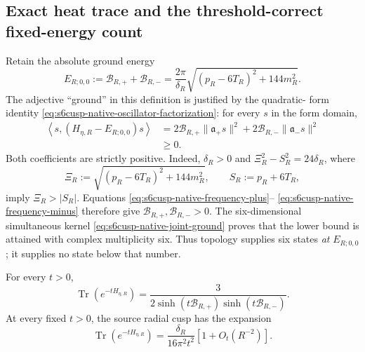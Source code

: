 \subsection{Exact heat trace and the threshold-correct fixed-energy count}
\label{subsec:s6cusp-native-heat-count}

Retain the absolute ground energy
\begin{equation}\label{eq:s6cusp-native-ground-energy}
 E_{R;0,0}:=\mathcal B_{R,+}+\mathcal B_{R,-}
 =\frac{2\pi}{\delta_R}
 \sqrt{(p_R-6T_R)^2+144m_R^2}.
\end{equation}
The adjective ``ground'' in this definition is justified by the quadratic-
form identity \eqref{eq:s6cusp-native-oscillator-factorization}: for every
\(s\) in the form domain,
\begin{align}
 \left\langle s,
 (H_{\eta,R}-E_{R;0,0})s\right\rangle
 &=2\mathcal B_{R,+}\lVert\mathfrak a_+s\rVert^2
   +2\mathcal B_{R,-}\lVert\mathfrak a_-s\rVert^2
 \label{eq:s6cusp-native-ground-lower-bound}\\
 &\ge0.
\end{align}
Both coefficients are strictly positive.  Indeed,
\(\delta_R>0\) and
\(\Xi_R^2-S_R^2=24\delta_R\), where
\begin{equation}\label{eq:s6cusp-Xi-S-definitions}
 \Xi_R:=\sqrt{(p_R-6T_R)^2+144m_R^2},
 \qquad S_R:=p_R+6T_R,
\end{equation}
imply \(\Xi_R>|S_R|\).  Equations
\eqref{eq:s6cusp-native-frequency-plus}--
\eqref{eq:s6cusp-native-frequency-minus} therefore give
\(\mathcal B_{R,+},\mathcal B_{R,-}>0\).  The six-dimensional simultaneous
kernel \eqref{eq:s6cusp-native-joint-ground} proves that the lower bound is
attained with complex multiplicity six.  Thus topology supplies six states
\emph{at} \(E_{R;0,0}\); it supplies no state below that number.

\begin{theorem}
\label{thm:s6cusp-native-heat-trace}
For every \(t>0\),
\begin{equation}\label{eq:s6cusp-native-heat-trace}
 \operatorname{Tr}(e^{-tH_{\eta,R}})
 =\frac{3}{
  2\sinh(t\mathcal B_{R,+})
   \sinh(t\mathcal B_{R,-})}.
\end{equation}
At every fixed \(t>0\), the source radial cusp has the expansion
\begin{equation}\label{eq:s6cusp-native-heat-trace-cusp}
 \operatorname{Tr}(e^{-tH_{\eta,R}})
 =\frac{\delta_R}{16\pi^2t^2}
 \left[1+O_t(R^{-2})\right].
\end{equation}
\end{theorem}

